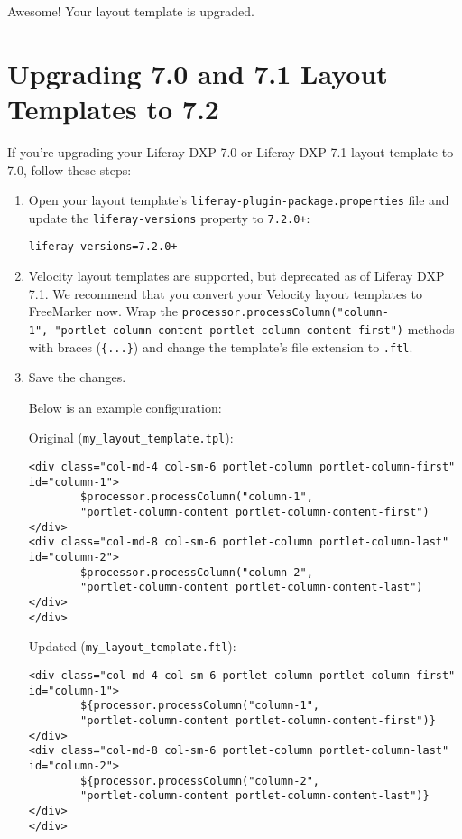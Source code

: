 Awesome! Your layout template is upgraded.

\chapter{Upgrading 7.0 and 7.1 Layout Templates to
7.2}\label{upgrading-7.0-and-7.1-layout-templates-to-7.2}

If you're upgrading your Liferay DXP 7.0 or Liferay DXP 7.1 layout
template to 7.0, follow these steps:

\begin{enumerate}
\def\labelenumi{\arabic{enumi}.}
\item
  Open your layout template's \texttt{liferay-plugin-package.properties}
  file and update the \texttt{liferay-versions} property to
  \texttt{7.2.0+}:

\begin{verbatim}
liferay-versions=7.2.0+
\end{verbatim}
\item
  Velocity layout templates are supported, but deprecated as of Liferay
  DXP 7.1. We recommend that you convert your Velocity layout templates
  to FreeMarker now. Wrap the
  \texttt{processor.processColumn("column-1",\ "portlet-column-content\ portlet-column-content-first")}
  methods with braces (\texttt{\{...\}}) and change the template's file
  extension to \texttt{.ftl}.
\item
  Save the changes.

  Below is an example configuration:

  Original (\texttt{my\_layout\_template.tpl}):

\begin{verbatim}
<div class="col-md-4 col-sm-6 portlet-column portlet-column-first" 
id="column-1">
        $processor.processColumn("column-1", 
        "portlet-column-content portlet-column-content-first")
</div>
<div class="col-md-8 col-sm-6 portlet-column portlet-column-last" 
id="column-2">
        $processor.processColumn("column-2", 
        "portlet-column-content portlet-column-content-last")
</div>
</div>
\end{verbatim}

  Updated (\texttt{my\_layout\_template.ftl}):

\begin{verbatim}
<div class="col-md-4 col-sm-6 portlet-column portlet-column-first" 
id="column-1">
        ${processor.processColumn("column-1", 
        "portlet-column-content portlet-column-content-first")}
</div>
<div class="col-md-8 col-sm-6 portlet-column portlet-column-last" 
id="column-2">
        ${processor.processColumn("column-2", 
        "portlet-column-content portlet-column-content-last")}
</div>
</div>
\end{verbatim}
\end{enumerate}

